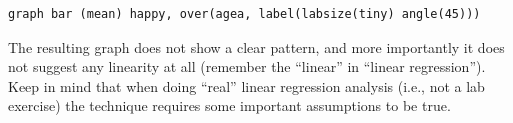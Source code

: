 \documentclass{article}
\begin{document}
\begin{lstlisting}
graph bar (mean) happy, over(agea, label(labsize(tiny) angle(45)))
\end{lstlisting}

The resulting graph does not show a clear pattern, and more importantly it does not suggest any linearity at all (remember the ``linear'' in ``linear regression''). Keep in mind that when doing ``real'' linear regression analysis (i.e., not a lab exercise) the technique requires some important assumptions to be true.
\end{document}
